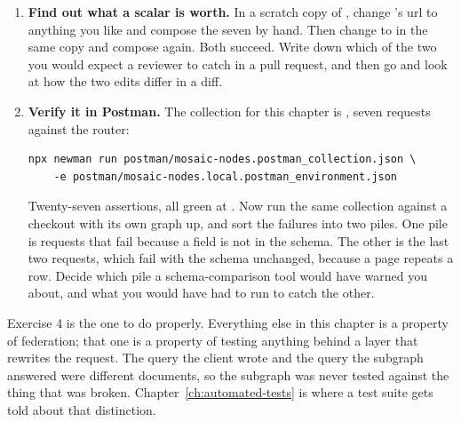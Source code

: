 \begin{enumerate}
  Ask 3004 for , then
  ask 5208 for . Compare what the ratings subgraph was
  asked with what the client asked for. Then add a third implementation to
  , a  with its own key, recompose, and see what
  it costs the ratings subgraph to support it.

  \item \textbf{Find out what a scalar is worth.} In a scratch copy of
  , change 's 
  url to anything you like and compose the seven by hand. Then change
   to  in the same copy and compose again.
  Both succeed. Write down which of the two you would expect a reviewer to catch
  in a pull request, and then go and look at how the two edits differ in a diff.

  \item \textbf{Verify it in Postman.} The collection for this chapter is
  , seven requests against the router:

  \begin{verbatim}
npx newman run postman/mosaic-nodes.postman_collection.json \
    -e postman/mosaic-nodes.local.postman_environment.json
  \end{verbatim}

  Twenty-seven assertions, all green at . Now run the same collection
  against a \code{ch12} checkout with its own graph up, and sort the failures
  into two piles. One pile is requests that fail because a field is not in the
  schema. The other is the last two requests, which fail with the schema
  unchanged, because a page repeats a row. Decide which pile a
  schema-comparison tool would have warned you about, and what you would have
  had to run to catch the other.
\end{enumerate}

Exercise 4 is the one to do properly. Everything else in this chapter is a
property of federation; that one is a property of testing anything behind a
layer that rewrites the request. The query the client wrote and the query the
subgraph answered were different documents, so the subgraph was never tested
against the thing that was broken.
Chapter~\ref{ch:automated-tests} is where a test suite gets told about that
distinction.
